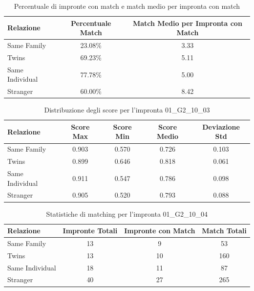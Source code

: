 \begin{table}[htbp]
\centering
\caption{Percentuale di impronte con match e match medio per impronta con match}
\label{tab:match_percentage_01_G2_10_03}
\begin{tabular}{|l|c|c|}
\hline
\textbf{Relazione} & \textbf{Percentuale Match} & \textbf{Match Medio per Impronta con Match} \\
\hline
Same Family & 23.08\% & 3.33 \\
\hline
Twins & 69.23\% & 5.11 \\
\hline
Same Individual & 77.78\% & 5.00 \\
\hline
Stranger & 60.00\% & 8.42 \\
\hline
\end{tabular}
\end{table}


\begin{table}[htbp]
\centering
\caption{Distribuzione degli score per l'impronta 01\_G2\_10\_03}
\label{tab:scores_01_G2_10_03}
\begin{tabular}{|l|c|c|c|c|}
\hline
\textbf{Relazione} & \textbf{Score Max} & \textbf{Score Min} & \textbf{Score Medio} & \textbf{Deviazione Std} \\
\hline
Same Family & 0.903 & 0.570 & 0.726 & 0.103 \\
\hline
Twins & 0.899 & 0.646 & 0.818 & 0.061 \\
\hline
Same Individual & 0.911 & 0.547 & 0.786 & 0.098 \\
\hline
Stranger & 0.905 & 0.520 & 0.793 & 0.088 \\
\hline
\end{tabular}
\end{table}


\begin{table}[htbp]
\centering
\caption{Statistiche di matching per l'impronta 01\_G2\_10\_04}
\label{tab:results_01_G2_10_04}
\begin{tabular}{|l|c|c|c|}
\hline
\textbf{Relazione} & \textbf{Impronte Totali} & \textbf{Impronte con Match} & \textbf{Match Totali} \\
\hline
Same Family & 13 & 9 & 53 \\
\hline
Twins & 13 & 10 & 160 \\
\hline
Same Individual & 18 & 11 & 87 \\
\hline
Stranger & 40 & 27 & 265 \\
\hline
\end{tabular}
\end{table}


